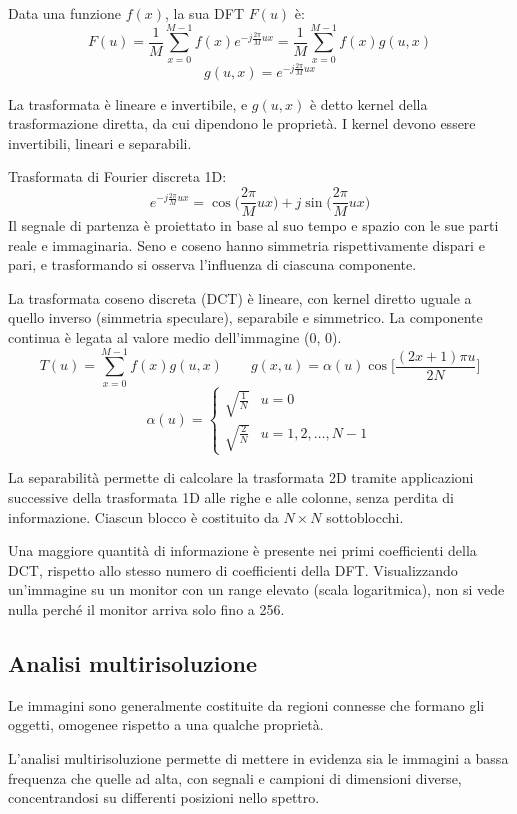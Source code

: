 Data una funzione $f(x)$, la sua DFT $F(u)$ è:
$$F(u) = \frac{1}{M} \sum_{x=0}^{M- 1}f(x)e^{-j\frac{2\pi}{M}ux} = \frac{1}{M} \sum_{x=0}^{M- 1}f(x)g(u, x)$$
$$g(u, x) = e^{-j\frac{2\pi}{M}ux}$$

La trasformata è lineare e invertibile, e $g(u, x)$ è detto kernel della trasformazione diretta, da cui dipendono le proprietà. I kernel devono essere invertibili, lineari e separabili.

Trasformata di Fourier discreta 1D:
$$e^{-j\frac{2\pi}{M}ux} = \cos\big(\frac{2\pi}{M}ux\big) + j\sin\big(\frac{2\pi}{M}ux\big)$$
Il segnale di partenza è proiettato in base al suo tempo e spazio con le sue parti reale e immaginaria. Seno e coseno hanno simmetria rispettivamente dispari e pari, e trasformando si osserva l'influenza di ciascuna componente. 

La trasformata coseno discreta (DCT) è lineare, con kernel diretto uguale a quello inverso (simmetria speculare), separabile e simmetrico. La componente continua è legata al valore medio dell'immagine (0, 0). 
$$T(u) = \sum_{x=0}^{M- 1}f(x)g(u, x) \qquad g(x, u) = \alpha(u) \cos\Big[\frac{(2x + 1)\pi u}{2N}\Big]$$
$$\alpha(u) = \begin{cases}
\sqrt{\frac{1}{N}} & u = 0 \\
\sqrt{\frac{2}{N}} & u = 1, 2, \dots, N - 1^{}
\end{cases}$$

La separabilità permette di calcolare la trasformata 2D tramite applicazioni successive della trasformata 1D alle righe e alle colonne, senza perdita di informazione. Ciascun blocco è costituito da $N \times N$ sottoblocchi.

Una maggiore quantità di informazione è presente nei primi coefficienti della DCT, rispetto allo stesso numero di coefficienti della DFT.
Visualizzando un'immagine su un monitor con un range elevato (scala logaritmica), non si vede nulla perché il monitor arriva solo fino a 256.

\subsection{Analisi multirisoluzione}
Le immagini sono generalmente costituite da regioni connesse che formano gli oggetti, omogenee rispetto a una qualche proprietà.

L'analisi multirisoluzione permette di mettere in evidenza sia le immagini a bassa frequenza che quelle ad alta, con segnali e campioni di dimensioni diverse, concentrandosi su differenti posizioni nello spettro. 

